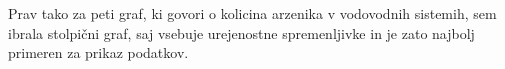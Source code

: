 \documentclass[11pt,a4paper]{article}
\begin{document}
Prav tako za peti graf, ki govori o kolicina arzenika v vodovodnih sistemih, sem ibrala stolpični graf, saj vsebuje urejenostne spremenljivke in je zato najbolj primeren za prikaz podatkov.



% 
% 
% 
\end{document}
